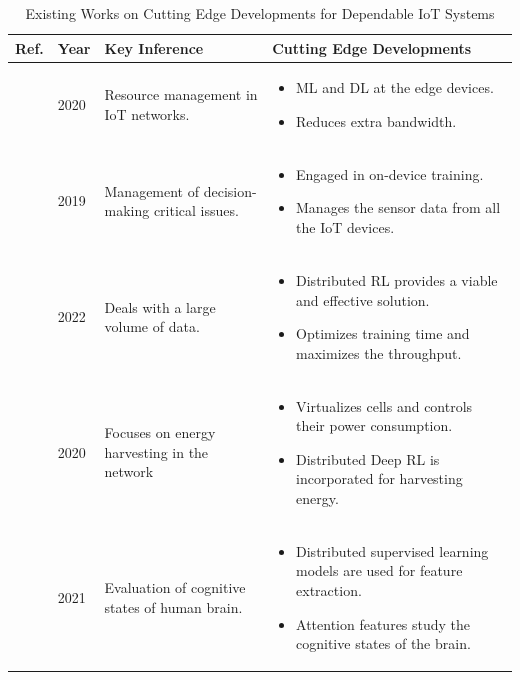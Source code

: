 \documentclass[journal]{IEEEtran}
\begin{document}
\begin{table}[!ht]
\centering
\caption{Existing Works on Cutting Edge Developments for Dependable IoT Systems} 
\label{tab:cuttingedge}
\begin{tabular}{|p{0.75cm}|p{0.5cm}|p{6.0cm}|p{9.0cm}|}
\hline
\textbf{Ref.} & \textbf{Year} & \textbf{Key Inference} & \textbf{Cutting Edge Developments}\\ \hline
\hline
\cite{hussain2020machine}  & 2020 & Resource management in IoT networks. &  
\begin{itemize}
    \item ML and DL at the edge devices.
    \item Reduces extra bandwidth.
\end{itemize}
\\ \hline
\cite{yao2019recommendations}  & 2019 & Management of decision-making critical issues. &  
\begin{itemize}
    \item Engaged in on-device training.
    \item Manages the sensor data from all the IoT devices.
\end{itemize}
\\ \hline
\cite{wang2022distributed}  & 2022 & Deals with a large volume of data. &  
\begin{itemize}
    \item Distributed RL provides a viable and effective solution.
    \item Optimizes training time and maximizes the throughput.
\end{itemize}
\\ \hline
\cite{temesgene2020distributed}  & 2020 & Focuses on energy harvesting in the network &  
\begin{itemize}
    \item Virtualizes cells and controls their power consumption. 
    \item Distributed Deep RL is incorporated for harvesting energy.
\end{itemize}
\\ \hline
\cite{grossberg2021attention}  & 2021 & Evaluation of cognitive states of human brain.  &  
\begin{itemize}
    \item Distributed supervised learning models are used for feature extraction.
    \item Attention features study the cognitive states of the brain.
\end{itemize}

\end{tabular}
\end{table}
\end{document}

